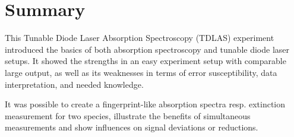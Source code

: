 
\chapter{Summary}
\label{chap:summary}

This Tunable Diode Laser Absorption Spectroscopy (TDLAS) experiment introduced the basics of both absorption spectroscopy and tunable diode laser setups. It showed the strengths in an easy experiment setup with comparable large output, as well as its weaknesses in terms of error susceptibility, data interpretation, and needed knowledge.

It was possible to create a fingerprint-like absorption spectra resp. extinction measurement for two species, illustrate the benefits of simultaneous measurements and show influences on signal deviations or reductions.